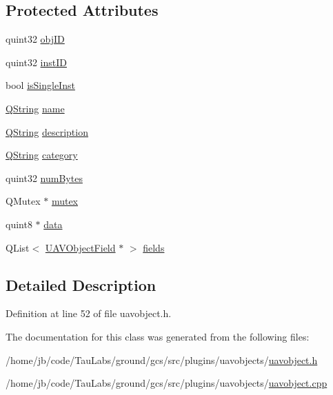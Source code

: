 \subsection*{\-Protected \-Attributes}
\begin{DoxyCompactItemize}
\item 
quint32 \hyperlink{group___u_a_v_objects_plugin_gafc50acdaa311c9fd9aaddf90fd578c14}{obj\-I\-D}
\item 
quint32 \hyperlink{group___u_a_v_objects_plugin_gad8d656542a04e9fbef607ff178f6d9d3}{inst\-I\-D}
\item 
bool \hyperlink{group___u_a_v_objects_plugin_gaa279cad3a000cc930e7f386672426bcb}{is\-Single\-Inst}
\item 
\hyperlink{group___u_a_v_objects_plugin_gab9d252f49c333c94a72f97ce3105a32d}{\-Q\-String} \hyperlink{group___u_a_v_objects_plugin_gadf898ed0961464f4a3f8e05fb28019f5}{name}
\item 
\hyperlink{group___u_a_v_objects_plugin_gab9d252f49c333c94a72f97ce3105a32d}{\-Q\-String} \hyperlink{group___u_a_v_objects_plugin_gaeeb0e865791ad6b21d83ef571d1ce48b}{description}
\item 
\hyperlink{group___u_a_v_objects_plugin_gab9d252f49c333c94a72f97ce3105a32d}{\-Q\-String} \hyperlink{group___u_a_v_objects_plugin_gae96da3f59e51fb5c3ca43056bda4a63e}{category}
\item 
quint32 \hyperlink{group___u_a_v_objects_plugin_ga260cfb19e663f64d51ba1258e760a207}{num\-Bytes}
\item 
\-Q\-Mutex $\ast$ \hyperlink{group___u_a_v_objects_plugin_gacf8a1ff5bac6d34fc1d7192a86194361}{mutex}
\item 
quint8 $\ast$ \hyperlink{group___u_a_v_objects_plugin_gadb2f4800bd3b6fb89c0f7c9fb67e49ff}{data}
\item 
\-Q\-List$<$ \hyperlink{class_u_a_v_object_field}{\-U\-A\-V\-Object\-Field} $\ast$ $>$ \hyperlink{group___u_a_v_objects_plugin_gaafc65699167bc5cedfd058400e484df6}{fields}
\end{DoxyCompactItemize}


\subsection{\-Detailed \-Description}


\-Definition at line 52 of file uavobject.\-h.



\-The documentation for this class was generated from the following files\-:\begin{DoxyCompactItemize}
\item 
/home/jb/code/\-Tau\-Labs/ground/gcs/src/plugins/uavobjects/\hyperlink{uavobject_8h}{uavobject.\-h}\item 
/home/jb/code/\-Tau\-Labs/ground/gcs/src/plugins/uavobjects/\hyperlink{uavobject_8cpp}{uavobject.\-cpp}\end{DoxyCompactItemize}

